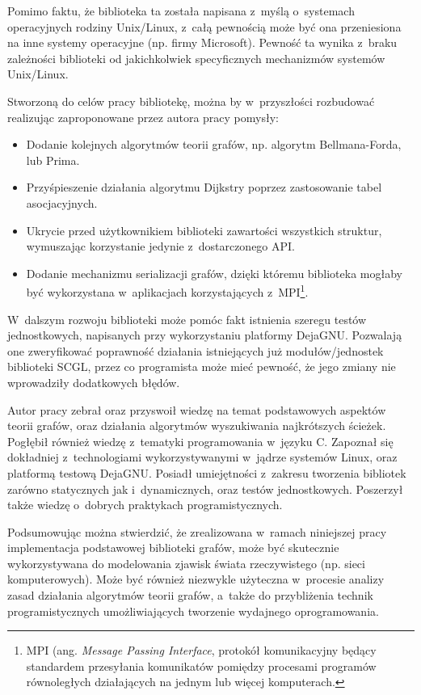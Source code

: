 \documentclass[a4paper,12pt,polish,twoside,openright]{thesis}
\begin{document}
Pomimo faktu, że biblioteka ta została napisana z~myślą o~systemach operacyjnych rodziny Unix/Linux, z~całą pewnością może być ona przeniesiona na inne systemy operacyjne (np. firmy Microsoft).
Pewność ta wynika z~braku zależności biblioteki od jakichkolwiek specyficznych mechanizmów systemów Unix/Linux.

Stworzoną do celów pracy bibliotekę, można by w~przyszłości rozbudować realizując zaproponowane przez autora pracy pomysły:
\begin{itemize}
	\item Dodanie kolejnych algorytmów teorii grafów, np. algorytm Bellmana-Forda, lub Prima.
	\item Przyśpieszenie działania algorytmu Dijkstry poprzez zastosowanie tabel asocjacyjnych.
	\item Ukrycie przed użytkownikiem biblioteki zawartości wszystkich struktur, wymuszając korzystanie jedynie z~dostarczonego API.
	\item Dodanie mechanizmu serializacji grafów, dzięki któremu biblioteka mogłaby być wykorzystana w~aplikacjach korzystających z~MPI\footnote{MPI (ang. \emph{Message Passing Interface}, protokół komunikacyjny będący standardem przesyłania komunikatów pomiędzy procesami programów równoległych działających na jednym lub więcej komputerach.}.
\end{itemize}
W~dalszym rozwoju biblioteki może pomóc fakt istnienia szeregu testów jednostkowych, napisanych przy wykorzystaniu platformy DejaGNU. Pozwalają one zweryfikować poprawność działania istniejących już modułów/jednostek biblioteki SCGL, przez co programista może mieć pewność, że jego zmiany nie wprowadziły dodatkowych błędów.

Autor pracy zebrał oraz przyswoił wiedzę na temat podstawowych aspektów teorii grafów, oraz działania algorytmów wyszukiwania najkrótszych ścieżek.
Pogłębił również wiedzę z~tematyki programowania w~języku C.
Zapoznał się dokładniej z~technologiami wykorzystywanymi w~jądrze systemów Linux, oraz platformą testową DejaGNU.
Posiadł umiejętności z~zakresu tworzenia bibliotek zarówno statycznych jak i~dynamicznych, oraz testów jednostkowych.
Poszerzył także wiedzę o~dobrych praktykach programistycznych.

Podsumowując można stwierdzić, że zrealizowana w~ramach niniejszej pracy implementacja podstawowej biblioteki grafów, może być skutecznie wykorzystywana do modelowania zjawisk świata rzeczywistego (np. sieci komputerowych).
Może być również niezwykle użyteczna w~procesie analizy zasad działania algorytmów teorii grafów, a~także do przybliżenia technik programistycznych umożliwiających tworzenie wydajnego oprogramowania.
\end{document}
